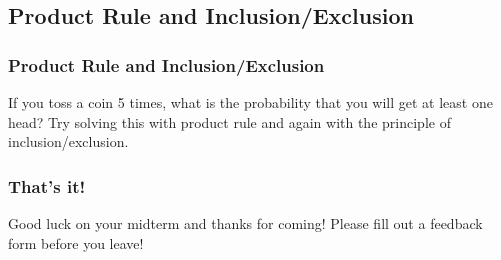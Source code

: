 \documentclass[9pt]{beamer}
\begin{document}
  \subsection{Product Rule and Inclusion/Exclusion}

\begin{frame}
  \frametitle{Product Rule and Inclusion/Exclusion}
If you toss a coin 5 times, what is the probability that you will get at least one head? Try solving this with product rule and again with the principle of inclusion/exclusion.\newline \newline


\end{frame}

\begin{frame}
  \frametitle{\huge{That's it!}}
\LARGE{Good luck on your midterm and thanks for coming! \newline
Please fill out a feedback form before you leave! \newline
}
\end{frame}
\end{document}
